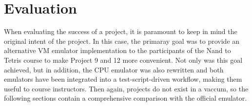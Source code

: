 \section{Evaluation} \label{evaluation}
When evaluating the success of a project, it is paramount to keep in mind the original intent of the project.
In this case, the primaray goal was to provide an alternative VM emulator implementation to the participants of the Nand to Tetris course to make Project 9 and 12 more convenient.
Not only was this goal achieved, but in addition, the CPU emulator was also rewritten and both emulators have been integrated into a test-script-driven workflow, making them useful to course instructors.
Then again, projects do not exist in a vaccum, so the following sections contain a comprehensive comparison with the official emulator.

